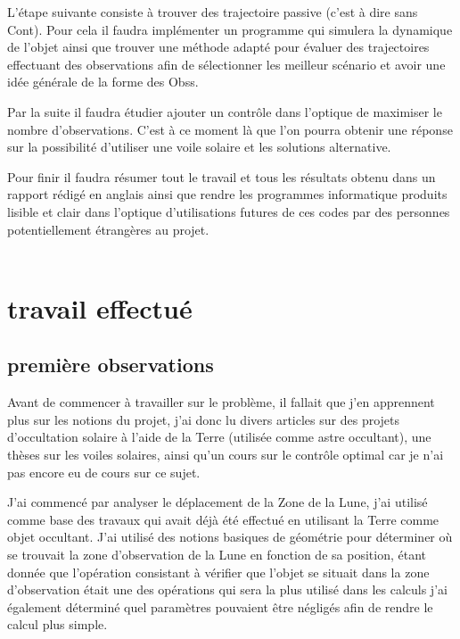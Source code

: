 \documentclass[12pt]{article} %
\begin{document}
		L'étape suivante consiste à trouver des trajectoire passive (c'est à dire sans \gls{Cont}). Pour cela il faudra implémenter un programme qui simulera la dynamique de l'objet ainsi que trouver une méthode adapté pour évaluer des trajectoires effectuant des observations afin de sélectionner les meilleur scénario et avoir une idée générale de la forme des \glspl{Obs}.
		
		Par la suite il faudra étudier ajouter un contrôle dans l'optique de maximiser le nombre d'observations. C'est à ce moment là que l'on pourra obtenir une réponse sur la possibilité d'utiliser une voile solaire et les solutions alternative.
		
		Pour finir il faudra résumer tout le travail et tous les résultats obtenu dans un rapport rédigé en anglais ainsi que rendre les programmes informatique produits lisible et clair dans l'optique d'utilisations futures de ces codes par des personnes potentiellement étrangères au projet.
		\\ \\
		
		\newpage
		\section{travail effectué}
		
		\subsection{première observations}
		Avant de commencer à travailler sur le problème, il fallait que j'en apprennent plus sur les notions du projet, j'ai donc lu divers articles sur des projets d'occultation solaire à l'aide de la Terre (utilisée comme astre occultant), une thèses sur les voiles solaires, ainsi qu'un cours sur le contrôle optimal car je n'ai pas encore eu de cours sur ce sujet.
		
		J'ai commencé par analyser le déplacement de la \gls{Zone} de la Lune, j'ai utilisé comme base des travaux qui avait déjà été effectué en utilisant la Terre comme objet occultant. J'ai utilisé des notions basiques de géométrie pour déterminer où se trouvait la zone d'observation de la Lune en fonction de sa position, étant donnée que l'opération consistant à vérifier que l'objet se situait dans la zone d'observation était une des opérations qui sera la plus utilisé dans les calculs j'ai également déterminé quel paramètres pouvaient être négligés afin de rendre le calcul plus simple.
		
\end{document}
